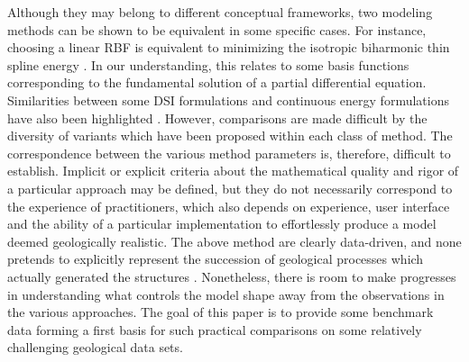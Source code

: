 \documentclass[preprint]{ring20}
\begin{document}
{Although they may belong to different conceptual frameworks, two modeling methods can be shown to be equivalent in some specific cases. For instance, choosing a linear RBF is equivalent to minimizing the isotropic biharmonic thin spline energy \citep{Carr2001}. In our understanding, this relates to some basis functions corresponding to the fundamental solution of a partial differential equation. Similarities between some DSI formulations and continuous energy formulations have also been highlighted \citep{Renaudeau2019MG}. However, comparisons are made difficult by the diversity of variants which have been proposed within each class of method. The correspondence between the various method parameters is, therefore, difficult to establish. Implicit or explicit criteria about the mathematical quality and rigor of a particular approach may be defined, but they do not necessarily correspond to the experience of practitioners, which also depends on experience, user interface and the ability of a particular implementation to effortlessly produce a model deemed geologically realistic. The above method are clearly data-driven, and none pretends to explicitly represent the succession of geological processes which actually generated the structures \citep{Caumon2010MG,Jessell2010T}. Nonetheless, there is room to make progresses in understanding what controls the model shape away from the observations in the various approaches. The goal of this paper is to provide some benchmark data forming a first basis for such practical comparisons on some relatively challenging geological data sets. 


}
\end{document}
